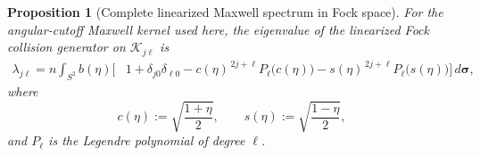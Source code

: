 \documentclass[11pt,oneside]{article}
\numberwithin{equation}{section}
\newtheorem{proposition}[theorem]{Proposition}
\theoremstyle{definition}
\begin{document}
\begin{proposition}[Complete linearized Maxwell spectrum in Fock space]
\label{prop:maxwell_complete_Fock_spectrum}
For the angular-cutoff Maxwell kernel used here, the eigenvalue of the
linearized Fock collision generator on $\mathscr K_{j\ell}$ is
\begin{equation}
\boxed{
\begin{aligned}
\lambda_{j\ell}
=
n\int_{S^2}b(\eta)
\Big[
&
1+\delta_{j0}\delta_{\ell0}
-c(\eta)^{\,2j+\ell}
P_\ell\!\bigl(c(\eta)\bigr)
-s(\eta)^{\,2j+\ell}
P_\ell\!\bigl(s(\eta)\bigr)
\Big]\,d\bm\sigma ,
\end{aligned}
}
\label{eq:maxwell_complete_Fock_spectrum}
\end{equation}
where
\begin{equation}
c(\eta):=\sqrt{\frac{1+\eta}{2}},
\qquad
s(\eta):=\sqrt{\frac{1-\eta}{2}},
\label{eq:maxwell_half_angle_cs}
\end{equation}
and $P_\ell$ is the Legendre polynomial of degree $\ell$.
\end{proposition}
\end{document}

